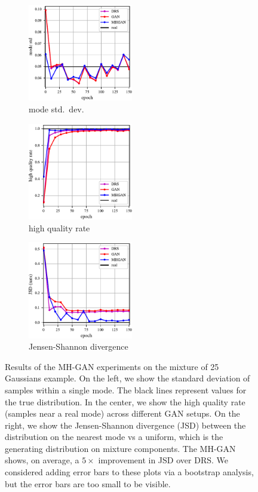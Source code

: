 \begin{figure}[htbp]
    \centering
    \begin{subfigure}[b]{0.32\textwidth}
       \centering
       \includegraphics[width=1.8in]{figures/std.pdf}
       \caption{mode std.~dev.}
       \label{fig:std}
    \end{subfigure}
    \begin{subfigure}[b]{0.32\textwidth}
       \centering
       \includegraphics[width=1.8in]{figures/hqr.pdf}
       \caption{high quality rate}
       \label{fig:hqr}
    \end{subfigure}
    \begin{subfigure}[b]{0.32\textwidth}
       \centering
       \includegraphics[width=1.8in]{figures/jsd.pdf}
       \caption{Jensen-Shannon divergence}
       \label{fig:jsd}
    \end{subfigure}
    \caption{{\small
    Results of the MH-GAN experiments on the mixture of 25 Gaussians example.
    On the left, we show the standard deviation of samples within a single mode.
    The black lines represent values for the true distribution.
    In the center, we show the high quality rate (samples near a real mode) across different GAN setups.
    On the right, we show the Jensen-Shannon divergence (JSD) between the distribution on the nearest mode vs a uniform, which is the generating distribution on mixture components.
    The MH-GAN shows, on average, a $5 \times$ improvement in JSD over DRS\@.
    We considered adding error bars to these plots via a bootstrap analysis, but the error bars are too small to be visible.
    }}
    \label{fig:mog_metrics}
\end{figure}

